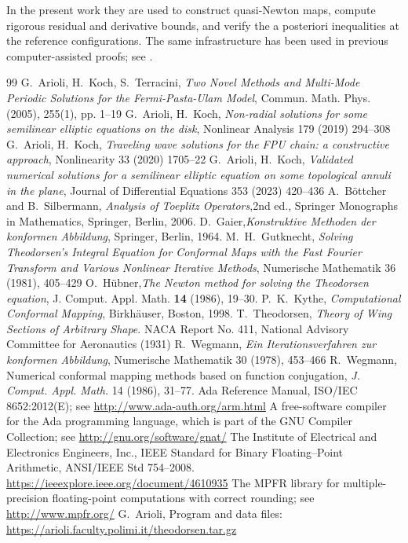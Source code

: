 \documentclass[11pt,a4paper]{amsart}
\begin{document}
In the present work they are used to construct quasi-Newton maps,
compute rigorous residual and derivative bounds, and verify the
a posteriori inequalities at the reference configurations. The same
infrastructure has been used in previous computer-assisted proofs; see
\cite{ArioliKoch1,ArioliKoch3}.

	\begin{thebibliography}{99}
G.~Arioli, H.~Koch, S.~Terracini, \emph{Two Novel Methods and Multi-Mode Periodic Solutions for the Fermi-Pasta-Ulam Model},
Commun. Math. Phys. (2005), 255(1), pp. 1–19
G.~Arioli, H.~Koch, \emph{Non-radial solutions for some semilinear elliptic equations on the disk}, Nonlinear Analysis 179 (2019) 294–308
G.~Arioli, H.~Koch, \emph{Traveling wave solutions for the FPU chain: a constructive approach}, Nonlinearity 33 (2020) 1705–22
G.~Arioli, H.~Koch, \emph{Validated numerical solutions for a semilinear elliptic	equation on some topological annuli in the plane}, Journal of Differential Equations 353 (2023) 420–436
A.~B\"ottcher and B.~Silbermann,
\emph{Analysis of Toeplitz Operators},2nd ed., Springer Monographs in Mathematics,
Springer, Berlin, 2006.
D.~Gaier,\emph{Konstruktive Methoden der konformen Abbildung},
Springer, Berlin, 1964.
M.~H.~Gutknecht, \emph{Solving Theodorsen's Integral Equation for Conformal Maps with the Fast Fourier Transform and Various Nonlinear Iterative Methods}, Numerische Mathematik 36 (1981), 405–429
O.~H\"ubner,\emph{The Newton method for solving the Theodorsen equation}, J. Comput. Appl. Math. \textbf{14} (1986), 19--30.
P.~K.~Kythe, \emph{Computational Conformal Mapping}, Birkh\"auser, Boston, 1998.
T.~Theodorsen, \emph{Theory of Wing Sections of Arbitrary Shape}. NACA Report No. 411, National Advisory Committee for Aeronautics (1931)
R.~Wegmann, \emph{Ein Iterationsverfahren zur konformen Abbildung}, Numerische Mathematik 30 (1978), 453--466
R.~Wegmann,
Numerical conformal mapping methods based on function conjugation,
\emph{J. Comput. Appl. Math.} 14 (1986), 31--77.
Ada Reference Manual, ISO/IEC 8652:2012(E); see 
\url{http://www.ada-auth.org/arm.html}
A free-software compiler for the Ada programming language,
which is part of the GNU Compiler Collection; see \url{http://gnu.org/software/gnat/}
The Institute of Electrical and Electronics Engineers, Inc.,
IEEE Standard for Binary Float\-ing--Point Arithmetic, ANSI/IEEE Std 754--2008. \url{https://ieeexplore.ieee.org/document/4610935}
 The MPFR library for multiple-precision floating-point computations
with correct rounding; see \url{http://www.mpfr.org/}
G.~Arioli, Program and data files: \url{https://arioli.faculty.polimi.it/theodorsen.tar.gz}

\end{thebibliography}
	
\end{document}
